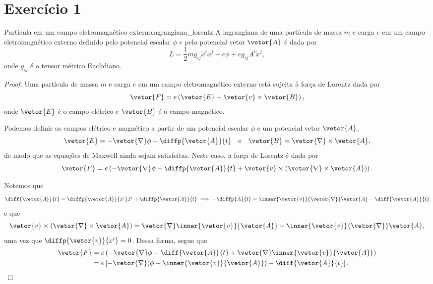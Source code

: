 \section*{Exercício 1}
\begin{lemma}{Partícula em um campo eletromagnético externo}{lagrangiana_lorentz}
    A lagrangiana de uma partícula de massa \(m\) e carga \(e\) em um campo eletromagnético externo definido pelo potencial escalar \(\phi\) e pelo potencial vetor \(\vetor{A}\) é dada por
    \begin{equation*}
        L = \frac12 m g_{ij} \dot{x}^i \dot{x}^j - e \phi + e g_{ij} A^i \dot{x}^j,
    \end{equation*}
    onde \(g_{ij}\) é o tensor métrico Euclidiano.
\end{lemma}
\begin{proof}
    Uma partícula de massa \(m\) e carga \(e\) em um campo eletromagnético externo está sujeita à força de Lorentz dada por
    \begin{equation*}
        \vetor{F} = e\left(\vetor{E} + \vetor{v}\times\vetor{B}\right),
    \end{equation*}
    onde \(\vetor{E}\) é o campo elétrico e \(\vetor{B}\) é o campo magnético.

    Podemos definir os campos elétrico e magnético a partir de um potencial escalar \(\phi\) e um potencial vetor \(\vetor{A}\),
    \begin{equation*}
        \vetor{E} = -\vetor{\nabla}\phi - \diffp{\vetor{A}}{t}\quad\text{e}\quad\vetor{B} = \vetor{\nabla} \times \vetor{A},
    \end{equation*}
    de modo que as equações de Maxwell ainda sejam satisfeitas. Neste caso, a força de Lorentz é dada por
    \begin{equation*}
        \vetor{F} = e\left(-\vetor{\nabla}\phi - \diffp{\vetor{A}}{t} + \vetor{v}\times (\vetor{\nabla}\times \vetor{A})\right).
    \end{equation*}

    Notemos que
    \begin{equation*}
        \diff{\vetor{A}}{t} = \diffp{\vetor{A}}{x^i}\dot{x}^i + \diffp{\vetor{A}}{t} \implies -\diffp{A}{t} = \inner{\vetor{v}}{\vetor{\nabla}}\vetor{A} - \diff{\vetor{A}}{t}
    \end{equation*}
    e que
    \begin{equation*}
        \vetor{v} \times (\vetor{\nabla}\times \vetor{A}) = \vetor{\nabla}\inner{\vetor{v}}{\vetor{A}} - \inner{\vetor{v}}{\vetor{\nabla}}\vetor{A},
    \end{equation*}
    uma vez que \(\diffp{\vetor{v}}{x^i} = 0\). Dessa forma, segue que
    \begin{align*}
        \vetor{F} &= e\left(-\vetor{\nabla}\phi - \diff{\vetor{A}}{t} + \vetor{\nabla}\inner{\vetor{v}}{\vetor{A}}\right)\\
                  &= e \left[- \vetor{\nabla}(\phi - \inner{\vetor{v}}{\vetor{A}}) - \diff{\vetor{A}}{t}\right].
    \end{align*}


\end{proof}
